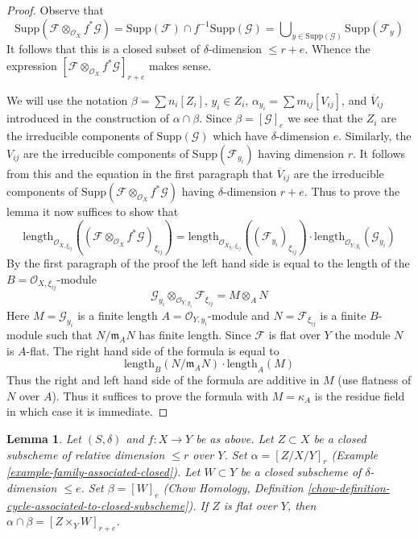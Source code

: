\documentclass{stacks-project}
\theoremstyle{plain}
\newtheorem{lemma}[subsection]{Lemma}
\theoremstyle{definition}
\theoremstyle{remark}
\numberwithin{equation}{subsection}
\begin{document}
\begin{proof}
Observe that
$$
\text{Supp}(\mathcal{F} \otimes_{\mathcal{O}_X} f^*\mathcal{G}) =
\text{Supp}(\mathcal{F}) \cap f^{-1}\text{Supp}(\mathcal{G}) =
\bigcup\nolimits_{y \in \text{Supp}(\mathcal{G})} \text{Supp}(\mathcal{F}_y)
$$
It follows that this is a closed subset of $\delta$-dimension $\leq r + e$.
Whence the expression
$[\mathcal{F} \otimes_{\mathcal{O}_X} f^*\mathcal{G}]_{r + e}$
makes sense.

\medskip\noindent
We will use the notation
$\beta = \sum n_i[Z_i]$, $y_i \in Z_i$,
$\alpha_{y_i} = \sum m_{ij} [V_{ij}]$, and
$\overline{V}_{ij}$ introduced in the construction
of $\alpha \cap \beta$. Since $\beta = [\mathcal{G}]_e$
we see that the $Z_i$ are the irreducible components of
$\text{Supp}(\mathcal{G})$ which have $\delta$-dimension $e$.
Similarly, the $V_{ij}$ are the irreducible components
of $\text{Supp}(\mathcal{F}_{y_i})$ having dimension $r$.
It follows from this and the equation in the first
paragraph that $\overline{V}_{ij}$ are the irreducible
components of
$\text{Supp}(\mathcal{F} \otimes_{\mathcal{O}_X} f^*\mathcal{G})$
having $\delta$-dimension $r + e$.
Thus to prove the lemma it now suffices to show that
$$
\text{length}_{\mathcal{O}_{X, \xi_{ij}}}(
(\mathcal{F} \otimes_{\mathcal{O}_X} f^*\mathcal{G})_{\xi_{ij}})
=
\text{length}_{\mathcal{O}_{X_{y_i}, \xi_{ij}}}((\mathcal{F}_{y_i})_{\xi_{ij}})
\cdot
\text{length}_{\mathcal{O}_{Y, y_i}}(\mathcal{G}_{y_i})
$$
By the first paragraph of the proof the left hand side is equal to
the length of the $B = \mathcal{O}_{X, \xi_{ij}}$-module
$$
\mathcal{G}_{y_i}
\otimes_{\mathcal{O}_{Y, y_i}}
\mathcal{F}_{\xi_{ij}} =
M \otimes_A N
$$
Here $M = \mathcal{G}_{y_i}$ is a finite length
$A = \mathcal{O}_{Y, y_i}$-module and $N = \mathcal{F}_{\xi_{ij}}$
is a finite $B$-module such that $N/\mathfrak m_AN$ has finite length.
Since $\mathcal{F}$ is flat over $Y$ the module $N$ is $A$-flat.
The right hand side of the formula is equal to
$$
\text{length}_B(N/\mathfrak m_A N) \cdot \text{length}_A(M)
$$
Thus the right and left hand side of the formula are additive in $M$
(use flatness of $N$ over $A$). Thus it suffices to prove the
formula with $M = \kappa_A$ is the residue field in which
case it is immediate.
\end{proof}

\begin{lemma}
\label{lemma-action-closed}
Let $(S, \delta)$ and $f : X \to Y$ be as above. Let $Z \subset X$
be a closed subscheme of relative dimension $\leq r$ over $Y$.
Set $\alpha = [Z/X/Y]_r$ (Example \ref{example-family-associated-closed}).
Let $W \subset Y$ be a closed subscheme of $\delta$-dimension $\leq e$.
Set $\beta = [W]_e$ (Chow Homology, Definition
\ref{chow-definition-cycle-associated-to-closed-subscheme}).
If $Z$ is flat over $Y$, then $\alpha \cap \beta = [Z \times_Y W]_{r + e}$.
\end{lemma}
\end{document}
